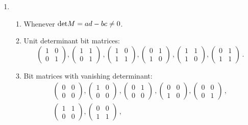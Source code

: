 \begin{enumerate}
\item 
\begin{enumerate}
\item Whenever ${\rm det} M=ad-bc\neq 0$.
\item Unit determinant bit matrices:
\[
\begin{pmatrix}
1&0\\0&1
\end{pmatrix},
\begin{pmatrix}
1&1\\0&1
\end{pmatrix}\, ,
\begin{pmatrix}
1&0\\1&1
\end{pmatrix},
\begin{pmatrix}
0&1\\1&0
\end{pmatrix}\, ,
\begin{pmatrix}
1&1\\1&0
\end{pmatrix},
\begin{pmatrix}
0&1\\1&1
\end{pmatrix}\,.
\]
\item Bit matrices with vanishing determinant:
\begin{gather*}
\begin{pmatrix}
0&0\\0&0
\end{pmatrix},
\begin{pmatrix}
1&0\\0&0
\end{pmatrix}\, ,
\begin{pmatrix}
0&1\\0&0
\end{pmatrix}\, ,
\begin{pmatrix}
0&0\\1&0
\end{pmatrix},
\begin{pmatrix}
0&0\\0&1
\end{pmatrix}\, ,\\
\begin{pmatrix}
1&1\\0&0
\end{pmatrix},
\begin{pmatrix}
0&0\\1&1
\end{pmatrix}\,,

\end{gather*}
\end{enumerate}
\end{enumerate}
